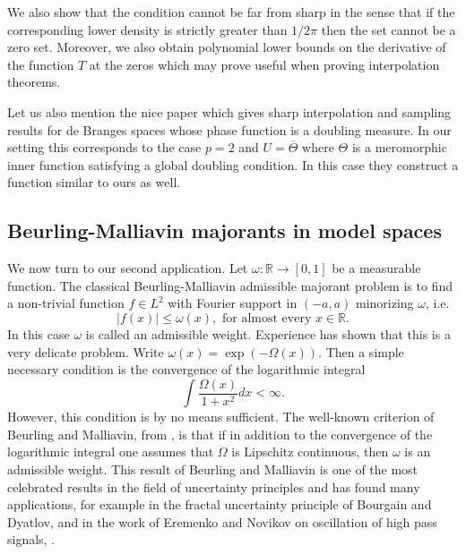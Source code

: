 \documentclass{article}[12pt]
\theoremstyle{remark}
\begin{document}
We also show that the condition cannot be far from sharp in the sense that if the corresponding lower density is strictly greater than $1/2\pi$ then the set cannot be a zero set. Moreover, we also obtain polynomial lower bounds on the derivative of the function $T$ at the zeros which may prove useful when proving interpolation theorems.

Let us also mention the nice paper \cite{MR2944102} which gives sharp interpolation and sampling results for de Branges spaces whose phase function is a doubling measure. In our setting this corresponds to the case $p = 2$ and $U = \overline{\Theta}$ where $\Theta$ is a meromorphic inner function satisfying a global doubling condition. In this case they construct a function similar to ours as well.


\subsection*{Beurling-Malliavin majorants in model spaces}

We now turn to our second application. Let $\omega : \mathbb{R} \to [0,1]$ be a measurable function. The classical Beurling-Malliavin admissible majorant problem is to find a non-trivial function $f \in L^{2}$ with Fourier support in $(-a,a)$ minorizing $\omega$, i.e.
    \begin{equation*}
        \lvert f(x) \rvert \leq \omega(x), \text{ for almost every } x \in \mathbb{R}.
    \end{equation*}
    In this case $\omega$ is called an admissible weight. Experience has shown that this is a very delicate problem. Write $\omega(x) = \exp(-\Omega(x))$. Then a simple necessary condition is the convergence of the logarithmic integral
    \begin{equation*}
        \int \frac{\Omega(x) }{1+x^{2}}dx < \infty.
    \end{equation*}
    However, this condition is by no means sufficient. The well-known criterion of Beurling and Malliavin, from \cite{MR147848}, is that if in addition to the convergence of the logarithmic integral one assumes that $\Omega$ is Lipschitz continuous, then $\omega$ is an admissible weight. This result of Beurling and Malliavin is one of the most celebrated results in the field of uncertainty principles and has found many applications, for example in the fractal uncertainty principle of Bourgain and Dyatlov, \cite{MR3779959} and in the work of Eremenko and Novikov on oscillation of high pass signals, \cite{MR2038065}.
\end{document}

